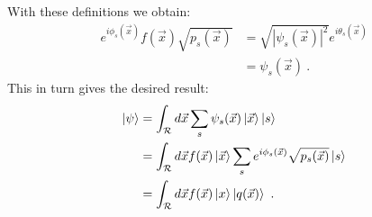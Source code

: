 \documentclass[draft,nofootinbib,pre,twocolumn,showpacs,showkeys,preprintnumbers,floatfix]{revtex4-1}
\newcommand{\1}{\mathbbm{1}}
\begin{document}
With these definitions we obtain:
\begin{align*}
e^{i\phi_s(\vec{x})} f(\vec{x}) \sqrt{p_s(\vec{x})}
  & = \sqrt{|\psi_s(\vec{x})|^2} e^{i\theta_s(\vec{x})} \\
  & = \psi_s(\vec{x})
  ~.
\end{align*}
This in turn gives the desired result:
\begin{align*}
\ket{\psi} & = \int_{\mathcal{R}} d\vec{x} \sum_{s} \psi_s(\vec{x})\ket{\vec{x}} \ket{s} \\
& = \int_{\mathcal{R}} d\vec{x} f(\vec{x}) \ket{\vec{x}}\sum_{s} e^{i\phi_s(\vec{x})}   \sqrt{p_s(\vec{x})}  \ket{s} \\
& = \int_{\mathcal{R}}d\vec{x} f(\vec{x}) \ket{x}\ket{q(\vec{x})}
  ~.
\end{align*}

\end{document}
